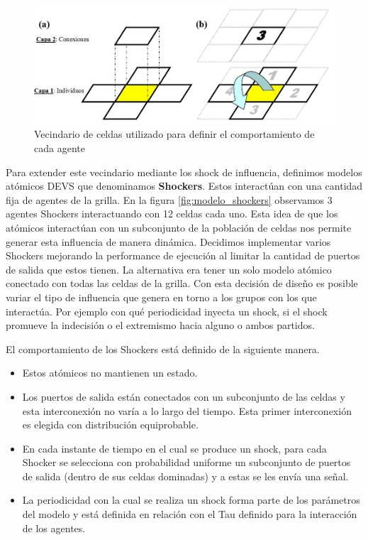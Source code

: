 \begin{figure}[!h]
\centering
\includegraphics[scale=0.5]{imagenes/modelo_pina.png}
\caption{Vecindario de celdas utilizado para definir el comportamiento de cada agente}
\label{fig:modelo_pina}
\end{figure}

Para extender este vecindario mediante los shock de influencia, definimos modelos atómicos DEVS\cite{DEVS} que denominamos \textbf{Shockers}. Estos interactúan con una cantidad fija de agentes de la grilla. En la figura \ref{fig:modelo_shockers} observamos 3 agentes Shockers interactuando con 12 celdas cada uno. Esta idea de que los atómicos interactúan con un subconjunto de la población de celdas nos permite generar esta influencia de manera dinámica. Decidimos implementar varios Shockers mejorando la performance de ejecución al limitar la cantidad de puertos de salida que estos tienen. La alternativa era tener un solo modelo atómico conectado con todas las celdas de la grilla.  Con esta decisión de diseño es posible variar el tipo de influencia que genera en torno a los grupos con los que interactúa. Por ejemplo con qué periodicidad inyecta un shock, si el shock promueve la indecisión o el extremismo hacia alguno o ambos partidos.

El comportamiento de los Shockers está definido de la siguiente manera.

\begin{itemize}
\item Estos atómicos no mantienen un estado.
\item Los puertos de salida están conectados con un subconjunto de las celdas y esta interconexión no varía a lo largo del tiempo. Esta primer interconexión es elegida con distribución equiprobable.
\item En cada instante de tiempo en el cual se produce un shock, para cada Shocker se selecciona con probabilidad uniforme un subconjunto de puertos de salida (dentro de sus celdas dominadas) y a estas se les envía una señal.
\item La periodicidad con la cual se realiza un shock forma parte de los parámetros del modelo y está definida en relación con el Tau definido para la interacción de los agentes.
\end{itemize}

